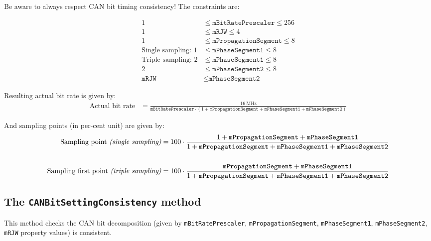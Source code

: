 \documentclass[10pt, a4paper, obeyspaces, openany]{extarticle}
\newcommand \subsectionLabel[2]{\subsection{#1}\label{subsec:#2}}
\begin{document}
Be aware to always respect CAN bit timing consistency! The constraints are:

\begin{align*}
1 & \leqslant \texttt{mBitRatePrescaler} \leqslant 256 \\
1 & \leqslant \texttt{mRJW} \leqslant 4 \\
1 & \leqslant \texttt{mPropagationSegment} \leqslant 8 \\
\text{Single sampling: }1 & \leqslant \texttt{mPhaseSegment1} \leqslant 8\\
\text{Triple sampling: }2 & \leqslant \texttt{mPhaseSegment1} \leqslant 8\\
2 & \leqslant \texttt{mPhaseSegment2} \leqslant 8 \\
\texttt{mRJW} &\leqslant \texttt{mPhaseSegment2}
\end{align*}

Resulting actual bit rate is given by:
{\small
\begin{align*}
\text{Actual bit rate} & = \frac{16~\text{MHz}}{\texttt{mBitRatePrescaler} \cdot (1 + \texttt{mPropagationSegment} + \texttt{mPhaseSegment1} + \texttt{mPhaseSegment2})}
\end{align*}
}

And sampling points (in per-cent unit) are given by:
{\small
\begin{align*}
\text{Sampling point {\it(single sampling)}} & = 100 \cdot \frac{1 + \texttt{mPropagationSegment} + \texttt{mPhaseSegment1}}{1 + \texttt{mPropagationSegment} + \texttt{mPhaseSegment1} + \texttt{mPhaseSegment2}}  \\
  & \\
\text{Sampling first point {\it(triple sampling)}} & = 100 \cdot \frac{\texttt{mPropagationSegment} + \texttt{mPhaseSegment1}}{1 + \texttt{mPropagationSegment} + \texttt{mPhaseSegment1} + \texttt{mPhaseSegment2}}
\end{align*}
}












\subsectionLabel{The \texttt{CANBitSettingConsistency} method}{CANBitSettingConsistency}

This method checks the CAN bit decomposition (given by \texttt{mBitRatePrescaler}, \texttt{mPropagationSegment}, \texttt{mPhaseSegment1}, \texttt{mPhaseSegment2}, \texttt{mRJW} property values) is consistent.
\end{document}
